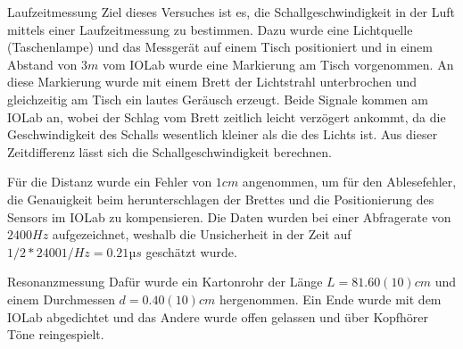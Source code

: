 \documentclass{alex_gp}
\begin{document}
\begin{mybox}{Laufzeitmessung}
	Ziel dieses Versuches ist es, die Schallgeschwindigkeit in der Luft mittels einer Laufzeitmessung zu bestimmen. Dazu wurde eine Lichtquelle (Taschenlampe) und das Messgerät auf einem Tisch positioniert und in einem Abstand von \( 3 \unit{m} \) vom IOLab wurde eine Markierung am Tisch vorgenommen. An diese Markierung wurde mit einem Brett der Lichtstrahl unterbrochen und gleichzeitig am Tisch ein lautes Geräusch erzeugt. Beide Signale kommen am IOLab an, wobei der Schlag vom Brett zeitlich leicht verzögert ankommt, da die Geschwindigkeit des Schalls wesentlich kleiner als die des Lichts ist. Aus dieser Zeitdifferenz lässt sich die Schallgeschwindigkeit berechnen. 
	
	Für die Distanz wurde ein Fehler von \( 1 \unit{cm} \) angenommen, um für den Ablesefehler, die Genauigkeit beim herunterschlagen der Brettes und die Positionierung des Sensors im IOLab zu kompensieren. Die Daten wurden bei einer Abfragerate von \( 2400 \unit{Hz} \) aufgezeichnet, weshalb die Unsicherheit in der Zeit auf \( 1/2*2400 \unit{1/Hz} = 0.21 \unit{µs} \) geschätzt wurde.
\end{mybox}

\begin{mybox}{Resonanzmessung}
	Dafür wurde ein Kartonrohr der Länge \( L = 81.60(10) \unit{cm} \) und einem Durchmessen \( d = 0.40(10) \unit{cm} \) hergenommen. Ein Ende wurde mit dem IOLab abgedichtet und das Andere wurde offen gelassen und über Kopfhörer Töne reingespielt. 
\end{mybox}
\end{document}
